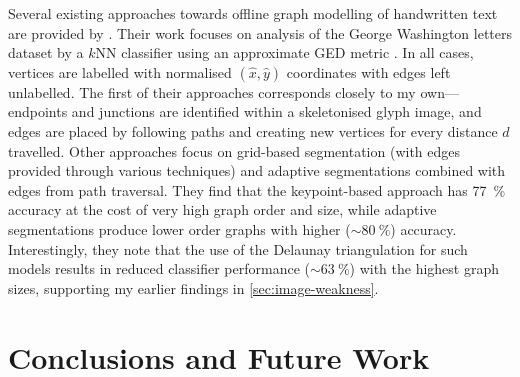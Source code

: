 \documentclass{mpaper}
\begin{document}
Several existing approaches towards offline graph modelling of handwritten text are provided by \citeauthor{Graphs-Handwriting} \cite{Graphs-Handwriting}.
Their work focuses on analysis of the George Washington letters dataset by a $k$NN classifier using an approximate GED metric \cite{GED-Approx}.
In all cases, vertices are labelled with normalised $(\hat{x}, \hat{y})$ coordinates with edges left unlabelled.
The first of their approaches corresponds closely to my own---endpoints and junctions are identified within a skeletonised glyph image, and edges are placed by following paths and creating new vertices for every distance $d$ travelled.
Other approaches focus on grid-based segmentation (with edges provided through various techniques) and adaptive segmentations combined with edges from path traversal.
They find that the keypoint-based approach has \SI{77}{\percent} accuracy at the cost of very high graph order and size, while adaptive segmentations produce lower order graphs with higher ($\sim\SI{80}{\percent}$) accuracy.
Interestingly, they note that the use of the Delaunay triangulation for such models results in reduced classifier performance ($\sim\SI{63}{\percent}$) with the highest graph sizes, supporting my earlier findings in \cref{sec:image-weakness}.


%
%

\section{Conclusions and Future Work}
\label{sec:conclusion}
\end{document}
